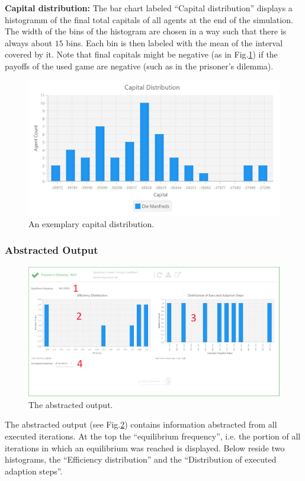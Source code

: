 \documentclass[parskip=full,11pt]{scrartcl}
\newcommand*\circled[1]{\tikz[baseline=(char.base)]{
            \node[shape=circle,draw,inner sep=2pt] (char) {#1};}}
\begin{document}
\textbf{Capital distribution:} The bar chart labeled \enquote{Capital distribution} \circled{3} displays a histogramm of the final total capitals of all agents at the end of the simulation. The width of the bins of the histogram are chosen in a way such that there is always about \(15\) bins. Each bin is then labeled with the mean of the interval covered by it. Note that final capitals might be negative (as in Fig.\ref{fig:capital_distribution}) if the payoffs of the used game are negative (such as in the prisoner's dilemma).

\begin{figure}[h]
	\centering
	\includegraphics[width=0.8\linewidth]{img_manual/capital_distribution.png}
	\caption{An exemplary capital distribution.}
	\label{fig:capital_distribution}
\end{figure}

\subsubsection{Abstracted Output}
\begin{figure}
	\centering
	\includegraphics[width=\linewidth]{img_manual/abstracted_output.png}
	\caption{The abstracted output.}
	\label{fig:abstracted_output}
\end{figure}
The abstracted output (see Fig.\ref{fig:abstracted_output}) contains information abstracted from all executed iterations. At the top \circled{1} the \enquote{equilibrium frequency}, i.e. the portion of all iterations in which an equilibrium was reached is displayed. Below reside two histograms, the \enquote{Efficiency distribution} and the \enquote{Distribution of executed adaption steps}.
\end{document}
